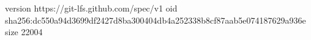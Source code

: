 version https://git-lfs.github.com/spec/v1
oid sha256:dc550a94d3699df2427d8ba300404db4a252338b8cf87aab5e074187629a936e
size 22004
